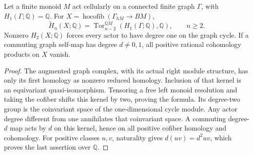 \begin{lemma}
\label{CP2:A-one-cycle-graph-cofiber}
Let a finite monoid $M$ act cellularly on a connected
finite graph $\Gamma$, with $H_1(\Gamma;\mathbb Q)=\mathbb Q$.
For $X=\operatorname{hocofib}(\Gamma_{hM}\to BM)$,
\[
 \widetilde H_n(X;\mathbb Q)
  =\operatorname{Tor}_{n-2}^{\mathbb QM}
           (H_1(\Gamma;\mathbb Q),\mathbb Q),\qquad n\geq2.
\]
Nonzero $H_2(X;\mathbb Q)$ forces every actor to have
degree one on the graph cycle. If a commuting graph
self-map has degree $d\ne0,1$, all positive rational
cohomology products on $X$ vanish.
\end{lemma}
\begin{proof}
The augmented graph complex, with its actual right module
structure, has only its first homology as nonzero reduced
homology. Inclusion of that kernel is an equivariant
quasi-isomorphism. Tensoring a free left monoid resolution
and taking the cofiber shifts this kernel by two, proving
the formula. Its degree-two group is the coinvariant space
of the one-dimensional cycle module. Any actor degree
different from one annihilates that coinvariant space.
A commuting degree-$d$ map acts by $d$ on this kernel,
hence on all positive cofiber homology and cohomology.
For positive classes $u,v$, naturality gives $d(uv)=d^2uv$,
which proves the last assertion over $\mathbb Q$.
\end{proof}

